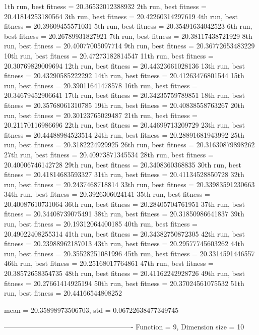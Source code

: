 1th run, best fitness = 20.36532012388932
2th run, best fitness = 20.41814253180564
3th run, best fitness = 20.42260314297619
4th run, best fitness = 20.39609455571031
5th run, best fitness = 20.35491634042523
6th run, best fitness = 20.26789931827921
7th run, best fitness = 20.38117438721929
8th run, best fitness = 20.40077005097714
9th run, best fitness = 20.36772653483229
10th run, best fitness = 20.47273182814547
11th run, best fitness = 20.30769829009694
12th run, best fitness = 20.44323661028136
13th run, best fitness = 20.43290585222292
14th run, best fitness = 20.41263476801544
15th run, best fitness = 20.39011641478578
16th run, best fitness = 20.34679452906641
17th run, best fitness = 20.34235759789851
18th run, best fitness = 20.35768061310785
19th run, best fitness = 20.40838558763267
20th run, best fitness = 20.30123765029487
21th run, best fitness = 20.21170116986696
22th run, best fitness = 20.44699713209729
23th run, best fitness = 20.44488984523514
24th run, best fitness = 20.28891681943992
25th run, best fitness = 20.3182224929925
26th run, best fitness = 20.31630879898262
27th run, best fitness = 20.40973871345534
28th run, best fitness = 20.40006746142728
29th run, best fitness = 20.3408360368835
30th run, best fitness = 20.41814683593327
31th run, best fitness = 20.41134528850728
32th run, best fitness = 20.2437468718814
33th run, best fitness = 20.33983591230663
34th run, best fitness = 20.3926306024141
35th run, best fitness = 20.40087610731064
36th run, best fitness = 20.28405704761951
37th run, best fitness = 20.34408739075491
38th run, best fitness = 20.31850986641837
39th run, best fitness = 20.19312064400185
40th run, best fitness = 20.49022408255314
41th run, best fitness = 20.34382750872305
42th run, best fitness = 20.23988962187013
43th run, best fitness = 20.29577745603262
44th run, best fitness = 20.35528251081996
45th run, best fitness = 20.3314591446557
46th run, best fitness = 20.25168017764861
47th run, best fitness = 20.38572658354735
48th run, best fitness = 20.41162242928726
49th run, best fitness = 20.27661414925194
50th run, best fitness = 20.37024561075532
51th run, best fitness = 20.44166544808252

mean = 20.35898973506703, std = 0.06722638477349745

-------------------------------------------------------
Function = 9, Dimension size = 10

